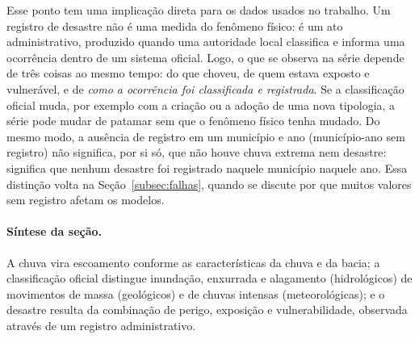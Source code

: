 Esse ponto tem uma implicação direta para os dados usados no trabalho. Um registro de desastre não é uma medida do fenômeno físico: é um ato administrativo, produzido quando uma autoridade local classifica e informa uma ocorrência dentro de um sistema oficial.  Logo, o que se observa na série depende de três coisas ao mesmo tempo: do que choveu, de quem estava exposto e vulnerável, e de \emph{como a ocorrência foi classificada e registrada}. Se a classificação oficial muda, por exemplo com a criação ou a adoção de uma nova tipologia, a série pode mudar de patamar sem que o fenômeno físico tenha mudado. Do mesmo modo, a ausência de registro em um município e ano (município-ano sem registro) não significa, por si só, que não houve chuva extrema nem desastre: significa que nenhum desastre foi registrado naquele município naquele ano. Essa distinção volta na Seção~\ref{subsec:falhas}, quando se discute por que muitos valores sem registro afetam os modelos.

\paragraph{Síntese da seção.} A chuva vira escoamento conforme as características da chuva e da bacia; a classificação oficial distingue inundação, enxurrada e alagamento (hidrológicos) de movimentos de massa (geológicos) e de chuvas intensas (meteorológicas); e o desastre resulta da combinação de perigo, exposição e vulnerabilidade, observada através de um registro administrativo.